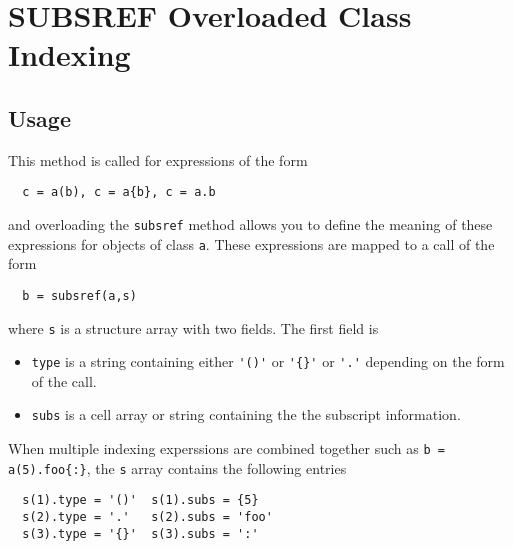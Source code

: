 \section{SUBSREF Overloaded Class Indexing}

\subsection{Usage}

This method is called for expressions of the form
\begin{verbatim}
  c = a(b), c = a{b}, c = a.b
\end{verbatim}
and overloading the \verb|subsref| method allows you
to define the meaning of these expressions for
objects of class \verb|a|.  These expressions are
mapped to a call of the form
\begin{verbatim}
  b = subsref(a,s)
\end{verbatim}
where \verb|s| is a structure array with two fields. The
first field is
\begin{itemize}
\item  \verb|type|  is a string containing either \verb|'()'| or
 \verb|'{}'| or \verb|'.'| depending on the form of the call.

\item  \verb|subs| is a cell array or string containing the
 the subscript information.

\end{itemize}
When multiple indexing experssions are combined together
such as \verb|b = a(5).foo{:}|, the \verb|s| array contains
the following entries
\begin{verbatim}
  s(1).type = '()'  s(1).subs = {5}
  s(2).type = '.'   s(2).subs = 'foo'
  s(3).type = '{}'  s(3).subs = ':'
\end{verbatim}

